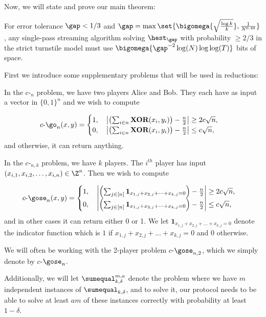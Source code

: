 Now, we will state and prove our main theorem:
\begin{theorem}\label{thm:L0}
	For error tolerance $\gap <1/3$ and $\gap=\max\set{\bigomega{ \sqrt{\frac{\log k}{k}}}, \frac{1}{{N}^{0.49}}}$, 
	any single-pass streaming algorithm solving $\hest_\gap$ with probability $\ge 2/3$ in the strict turnstile model
	must use $\bigomega{\gap^{-2}\log (N)\log\log(T)}$ bits of space.
\end{theorem}

First we introduce some supplementary problems that will be used in reductions:

\begin{definition}
In the $c$-\go$_n$ problem, we have two players Alice and Bob. They each have as input a vector in $\{0,1\}^n$ and we wish to compute 

$$c\text{-}\go_n(x,y) = \begin{cases}
1, \quad \left|\left(\sum_{i \in n} \textbf{XOR}(x_i,y_i)\right) - \frac{n}{2}\right| \ge 2c\sqrt{n},\\
0, \quad \left|\left(\sum_{i \in n}  \textbf{XOR}(x_i,y_i)\right) - \frac{n}{2}\right| \le c\sqrt{n},\\
\end{cases}
$$
and otherwise, it can return anything.
\end{definition}
{\color{black}
\begin{definition}
In the $c$-\gose$_{n,k}$ problem, we have $k$ players. The $i^{th}$ player has input $(x_{i,1}, x_{i,2}, \dots, x_{i,n}) \in \Z^n$. Then we wish to compute

$$c\text{-}\gose_n(x,y) = \begin{cases}
1, \quad \left|\left(\sum_{j \in [n]} \mathbf{1}_{x_{1,j} + x_{2,j} + \dots + x_{k,j}= 0}\right) - \frac{n}{2}\right| \ge 2c\sqrt{n},\\
0, \quad \left|\left(\sum_{j \in [n]} \mathbf{1}_{x_{1,j} + x_{2,j} + \dots + x_{k,j}= 0}\right) - \frac{n}{2}\right| \le c\sqrt{n},\\
\end{cases}
$$
and in other cases it can return either 0 or 1. We let $\mathbf{1}_{x_{1,j} + x_{2,j} + \dots + x_{k,j}= 0}$ denote the indicator function which is $1$ if $x_{1,j} + x_{2,j} + \dots + x_{k,j}= 0$ and $0$ otherwise.
%

We will often be working with the 2-player problem $c$-$\gose_{n,2}$, which we simply denote by $c$-$\gose_n$.
\end{definition}
}
Additionally, we will let $\sumequal_{k,\delta}^{m,a}$ denote the problem where we have $m$ independent instances of $\sumequal_{k,\delta}$, and to solve it, our protocol needs to be able to solve at least $am$ of these instances correctly with probability at least $1-\delta$.

